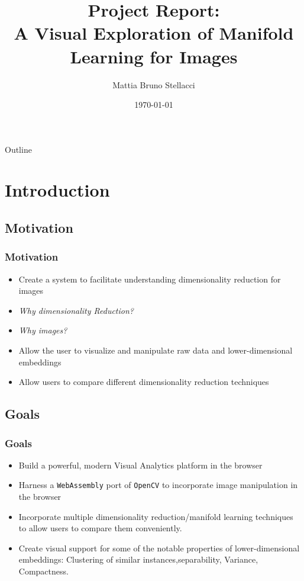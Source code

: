 \documentclass[aspectratio=1610]{beamer}
\title{Project Report:\\
A Visual Exploration of Manifold Learning for Images}
\author{Mattia Bruno Stellacci}
\date\today
\begin{document}
\begin{frame}[plain]
  \titlepage
\end{frame}


\begin{frame}{Outline}
  \tableofcontents

  \end{frame}




\section{Introduction}

\subsection {Motivation}
\begin{frame}
  \frametitle{Motivation}
  \begin{itemize}
    \item Create a system to facilitate understanding dimensionality reduction for images
    \item{\textit{Why dimensionality Reduction?}}   
    \item{\textit{Why images?}} %
    \item Allow the user to visualize and manipulate raw data and lower-dimensional embeddings
    \item Allow users to compare different dimensionality reduction techniques  
  \end{itemize}
\end{frame}


\subsection {Goals}
\begin{frame}
  \frametitle{Goals}

  \begin{itemize}
      \item Build a powerful, modern Visual Analytics platform in the browser
      \item Harness a \texttt{WebAssembly} port of \texttt{OpenCV} to incorporate image manipulation in the browser
      \item Incorporate multiple dimensionality reduction/manifold learning techniques to allow users to compare them conveniently. 
      \item Create visual support for some of the notable properties of lower-dimensional embeddings: Clustering of similar instances,separability, Variance, Compactness. 
  \end{itemize}

\end{frame}
\end{document}
